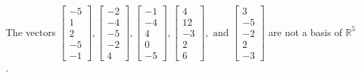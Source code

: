 \begin{exercise}
\begin{exerciseStatement}
  \end{exerciseStatement}
  \begin{exerciseAnswer}
   The vectors \(\left[\begin{array}{r}
-5 \\
1 \\
2 \\
-5 \\
-1
\end{array}\right] , \left[\begin{array}{r}
-2 \\
-4 \\
-5 \\
-2 \\
4
\end{array}\right] , \left[\begin{array}{r}
-1 \\
-4 \\
4 \\
0 \\
-5
\end{array}\right] , \left[\begin{array}{r}
4 \\
12 \\
-3 \\
2 \\
6
\end{array}\right] , \text{ and } \left[\begin{array}{r}
3 \\
-5 \\
-2 \\
2 \\
-3
\end{array}\right]\) 
  	 are not  a basis of \(\mathbb{R}^5\).
  


  \end{exerciseAnswer}
\end{exercise}